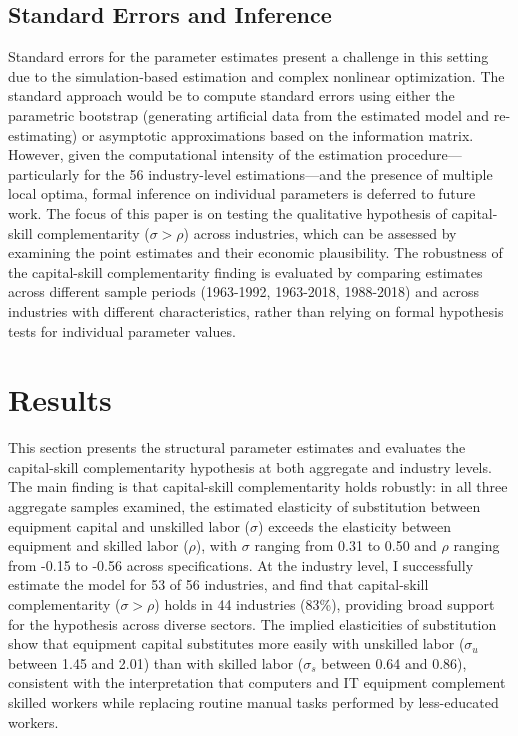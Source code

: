 \documentclass[12pt]{article}
\begin{document}
\subsection{Standard Errors and Inference}

Standard errors for the parameter estimates present a challenge in this setting due to the simulation-based estimation and complex nonlinear optimization. The standard approach would be to compute standard errors using either the parametric bootstrap (generating artificial data from the estimated model and re-estimating) or asymptotic approximations based on the information matrix. However, given the computational intensity of the estimation procedure---particularly for the 56 industry-level estimations---and the presence of multiple local optima, formal inference on individual parameters is deferred to future work. The focus of this paper is on testing the qualitative hypothesis of capital-skill complementarity ($\sigma > \rho$) across industries, which can be assessed by examining the point estimates and their economic plausibility. The robustness of the capital-skill complementarity finding is evaluated by comparing estimates across different sample periods (1963-1992, 1963-2018, 1988-2018) and across industries with different characteristics, rather than relying on formal hypothesis tests for individual parameter values.
\section{Results}\label{sec:results}

This section presents the structural parameter estimates and evaluates the capital-skill complementarity hypothesis at both aggregate and industry levels. The main finding is that capital-skill complementarity holds robustly: in all three aggregate samples examined, the estimated elasticity of substitution between equipment capital and unskilled labor ($\sigma$) exceeds the elasticity between equipment and skilled labor ($\rho$), with $\sigma$ ranging from 0.31 to 0.50 and $\rho$ ranging from -0.15 to -0.56 across specifications. At the industry level, I successfully estimate the model for 53 of 56 industries, and find that capital-skill complementarity ($\sigma > \rho$) holds in 44 industries (83\%), providing broad support for the hypothesis across diverse sectors. The implied elasticities of substitution show that equipment capital substitutes more easily with unskilled labor ($\sigma_u$ between 1.45 and 2.01) than with skilled labor ($\sigma_s$ between 0.64 and 0.86), consistent with the interpretation that computers and IT equipment complement skilled workers while replacing routine manual tasks performed by less-educated workers.
\end{document}
